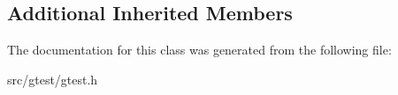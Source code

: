 \subsection*{Additional Inherited Members}


The documentation for this class was generated from the following file\+:\begin{DoxyCompactItemize}
\item 
src/gtest/gtest.\+h\end{DoxyCompactItemize}
